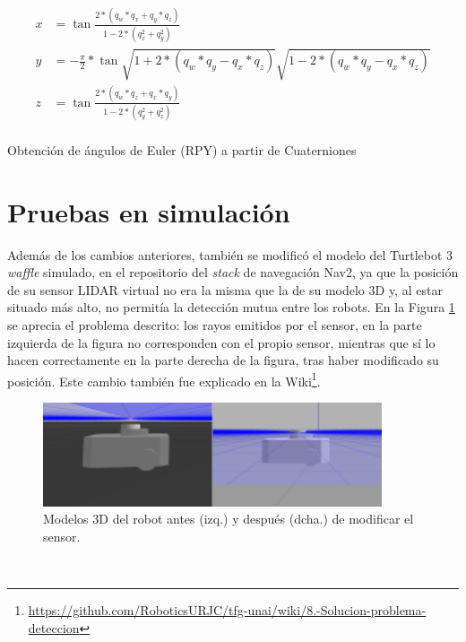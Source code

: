\begin{myequation}[h!]
  \begin{equation}
  \begin{aligned}
  x &= \tan{\frac{2 * (q_w*q_x + q_y*q_z)}{1 - 2 * (q_x^2 + q_y^2)}}  \\
  y &= -\frac{\pi}{2} * \tan{\sqrt{1 + 2 * (q_w * q_y - q_x * q_z)}}{\sqrt{1 - 2 * (q_w * q_y - q_x * q_z)}}  \\
  z &= \tan{\frac{2 * (q_w * q_z + q_x * q_y)}{1 - 2 * (q_y^2 + q_z^2)}}  \\
  \end{aligned}
  \label{ec:euler_to_quat}
  \end{equation}
  \caption[Obtención de ángulos de Euler (RPY) a partir de Cuaterniones]{Obtención de ángulos de Euler (RPY) a partir de Cuaterniones}
\end{myequation}



\section{Pruebas en simulación}
\label{sec:pruebas_sim}

Además de los cambios anteriores, también se modificó el modelo del Turtlebot 3
\textit{waffle} simulado, en el repositorio del \textit{stack} de navegación
Nav2, ya que la posición de su sensor LIDAR virtual no era la misma que la de su
modelo 3D y, al estar situado más alto, no permitía la detección mutua entre los
robots.
En la Figura \ref{fig:mutua_deteccion} se aprecia el problema descrito: los
rayos emitidos por el sensor, en la parte izquierda de la figura no corresponden
con el propio sensor, mientras que sí lo hacen correctamente en la parte derecha
de la figura, tras haber modificado su posición.
Este cambio también fue explicado en la Wiki\footnote{
\href{https://github.com/RoboticsURJC/tfg-unai/wiki/8.-Soluci\%C3\%B3n-del-problema-de-mutua-detecci\%C3\%B3n-de-los-Turtlebot3-\%5B28-Jun---29-Jul\%5D}{https://github.com/RoboticsURJC/tfg-unai/wiki/8.-Solucion-problema-deteccion}}.

\begin{figure} [h!]
  \begin{center}
    \includegraphics[width=10cm]{figs/turtlebot_model_mods}
  \end{center}
  \caption{Modelos 3D del robot antes (izq.) y después (dcha.) de modificar el sensor.}
  \label{fig:mutua_deteccion}
\end{figure}\

